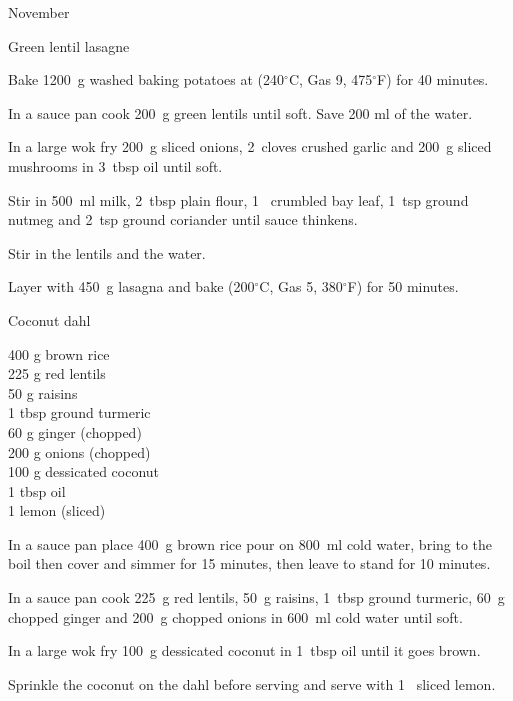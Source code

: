 \begin{menu}{November}
\begin{recipe}{2}{Green lentil lasagne}
    \begin{instructions}
    \item 
      Bake 
      1200~g washed baking potatoes
      at
      (240$^{\circ}$C, Gas 9, 475$^{\circ}$F) for 40 minutes.
    \item 
        In a sauce pan cook
        200~g  green lentils
        until soft.
        Save 200 ml of the water.
      \item 
        In a large wok fry
        200~g sliced onions,
        2~cloves crushed garlic
        and
        200~g sliced mushrooms
        in
        3~tbsp  oil
        until soft.
      \item 
        Stir in
        500~ml  milk,
        2~tbsp  plain flour,
        1~ crumbled bay leaf,
        1~tsp  ground nutmeg
        and
        2~tsp  ground coriander
        until sauce thinkens.
      \item 
        Stir in
        the lentils
        and
        the water.
      \item 
        Layer with
        450~g  lasagna
        and bake (200$^{\circ}$C, Gas 5, 380$^{\circ}$F) for 50 minutes.
      
    \end{instructions}
    \end{recipe}%
  
    \begin{recipe}{2}{Coconut dahl}%
		\begin{ingredients}
		400 g brown rice  \\
	225 g red lentils  \\
	50 g raisins  \\
	1 tbsp ground turmeric  \\
	60 g ginger (chopped) \\
	200 g onions (chopped) \\
	100 g dessicated coconut  \\
	1 tbsp oil  \\
	1  lemon (sliced) \\
	
		\end{ingredients}
	
    \begin{instructions}
    \item 
      In a
      sauce pan
      place
      400~g  brown rice
      pour on
      800~ml  cold water,
      bring to the boil then cover and simmer for 15 minutes,
      then leave to stand for 10 minutes.
    \item 
        In a sauce pan cook
        225~g  red lentils,
        50~g  raisins,
        1~tbsp  ground turmeric,
        60~g chopped ginger
        and
        200~g chopped onions
        in
        600~ml  cold water
        until soft.
      \item 
        In a large wok fry
        100~g  dessicated coconut
        in
        1~tbsp  oil
        until it goes brown.
      \item 
        Sprinkle the coconut on the dahl
        before serving
        and
        serve with
        1~ sliced lemon.
      

\end{instructions}
\end{recipe}
\end{menu}
